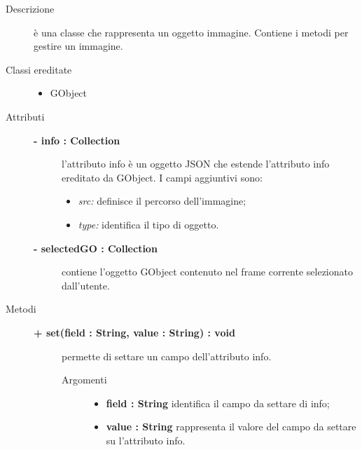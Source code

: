 \begin{description}
\item[Descrizione] \hfill
	è una classe che rappresenta un oggetto immagine. Contiene i metodi per gestire un immagine.
	
\item[Classi ereditate] \hfill
	\begin{itemize}
		\item GObject
	\end{itemize}
	
\item[Attributi] \hfill
	\begin{description}
		\item[\textbf{- info : Collection			}] \hfill
			l'attributo info è un oggetto JSON che estende l'attributo info ereditato da GObject. I campi aggiuntivi sono:
	\begin{itemize}
		\item \textit{src:} definisce il percorso dell'immagine;
		\item \textit{type:} identifica il tipo di oggetto.		
	\end{itemize}
	\end{description}
	\begin{description}
		\item[\textbf{- selectedGO : Collection			}] \hfill
			contiene l'oggetto GObject contenuto nel frame corrente selezionato dall'utente.  
	\end{description}	
	
\item[Metodi] \hfill

		\begin{description}
		\item[\textbf{\color{blue}+ set(field : String, value : String) : void			}] \hfill
			permette di settare un campo dell'attributo info.
			
		\begin{description}
			\item[Argomenti] \hfill
				\begin{itemize}
				
					\item \textbf{field : String			} \hfill
					identifica il campo da settare di info;
					\item \textbf{value : String			} \hfill
					rappresenta il valore del campo da settare su l'attributo info.
				\end{itemize}
		\end{description}


\end{description}
\end{description}
